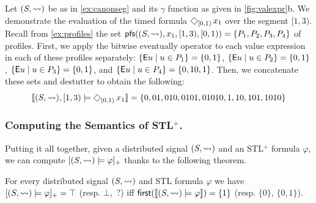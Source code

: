 \begin{example} \label{ex:timed}
	Let $(S, {\rightsquigarrow})$ be as in \cref{ex:canonseg} and its $\gamma$ function as given in \cref{fig:valexpr}b.
	We demonstrate the evaluation of the timed formula $\LTLeventually_{[0,1)} x_1$ over the segment $[1,3)$.
	Recall from \cref{ex:profiles} the set $\mathsf{pfs}((S,{\rightsquigarrow}), x_1, [1,3), [0,1)) = \{P_1, P_2, P_3, P_4\}$ of profiles.
	First, we apply the bitwise eventually operator to each value expression in each of these profiles separately:
	$\{ \mathsf{E} u \st u \in P_1 \} = \{ 0, 1 \}$, $\{ \mathsf{E} u \st u \in P_2 \} = \{ 0, 1 \}$, $\{ \mathsf{E} u \st u \in P_3 \} = \{ 0, 1 \}$, and $\{ \mathsf{E} u \st u \in P_4 \} = \{ 0, 10, 1 \}$.
	Then, we concatenate these sets and destutter to obtain the following:
	\[ 	\llbracket (S, {\hb}), [1,3) \models \LTLeventually_{[0,1)} x_1 \rrbracket = \{ 0, 01, 010, 0101, 01010, 1, 10, 101, 1010 \}  \]
\end{example}

\subsubsection{Computing the Semantics of STL$^+$.}

Putting it all together, given a distributed signal $(S, {\rightsquigarrow})$ and an STL$^+$ formula $\varphi$, we can compute $[(S,{\rightsquigarrow}) \models \varphi]_+$ thanks to the following theorem.

\begin{theorem} \label{cl:algo}
	For every distributed signal $(S,{\rightsquigarrow})$ and STL formula $\varphi$ we have $[(S,{\rightsquigarrow}) \models \varphi]_+ = \top$ (resp. $\bot$, ${\,?}$) iff $\textsf{first}(\llbracket (S, {\rightsquigarrow}) \models \varphi \rrbracket) = \{1\}$ (resp. $\{0\}$, $\{0,1\}$).
\end{theorem}

